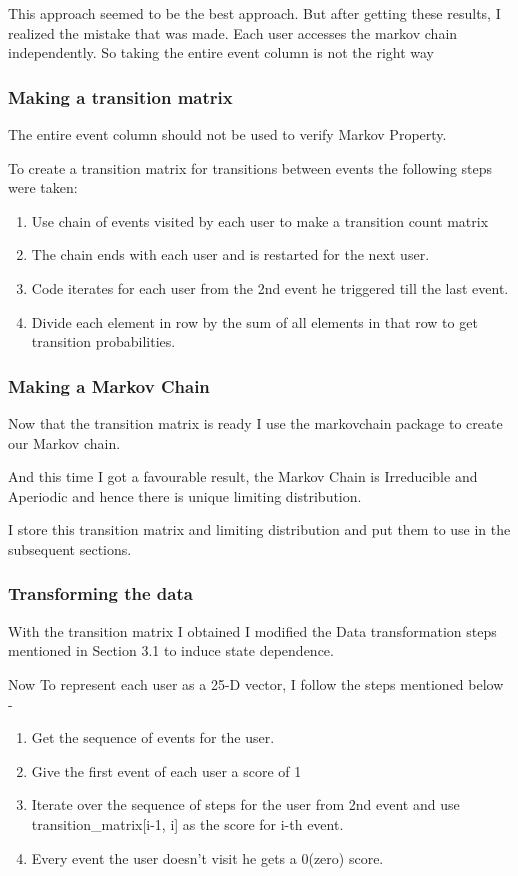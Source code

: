 \documentclass{article}
\begin{document}
This approach seemed to be the best approach. But after getting these results, I realized the mistake that was made.
Each user accesses the markov chain independently. So taking the entire event column is not the right way

\subsubsection{Making a transition matrix}
The entire event column should not be used to verify Markov Property.

To create a transition matrix for transitions between events the following steps were taken:

\begin{enumerate}
    \item Use chain of events visited by each user to make a transition count matrix
    \item The chain ends with each user and is restarted for the next user.
    \item Code iterates for each user from the 2nd event he triggered till the last event.
    \item Divide each element in row by the sum of all elements in that row to get transition probabilities.
\end{enumerate}

\subsubsection{Making a Markov Chain}
Now that the transition matrix is ready I use the markovchain package to create our Markov chain.

And this time I got a favourable result, the Markov Chain is Irreducible and Aperiodic and hence there is unique limiting distribution.

I store this transition matrix and limiting distribution and put them to use in the subsequent sections.


\subsubsection{Transforming the data}
With the transition matrix I obtained I modified the Data transformation steps mentioned in Section 3.1 to induce state dependence.

Now To represent each user as a 25-D vector, I follow the steps mentioned below - 
\begin{enumerate}
    \item Get the sequence of events for the user.
    \item Give the first event of each user a score of 1
    \item Iterate over the sequence of steps for the user from 2nd event and use transition\_matrix[i-1, i] as the score for i-th event.
    \item Every event the user doesn't visit he gets a 0(zero) score.
\end{enumerate}
\end{document}
